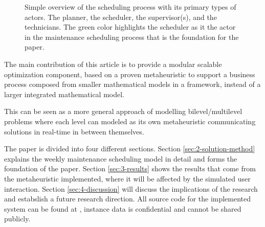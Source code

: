 \begin{figure}
	
	\caption{Simple overview of the scheduling process with its primary types of
		actors. The planner, the scheduler, the supervisor(s), and the technicians. 		
		The green color highlights the scheduler as it the actor in the maintenance
		scheduling process that is the foundation for the paper.}
	\label{fig:integrated:maintenance-process}
\end{figure}

The main contribution of this article is to provide a
modular scalable optimization component,  based on a proven
metaheuristic to support a business process composed from
smaller mathematical models in a framework, instead of a
larger integrated mathematical model.

This can be seen as a more general approach of modelling bilevel/multilevel
problems \citep{camacho-vallejo_metaheuristics_2024}  where each level can
modeled as its own metaheuristic communicating solutions in real-time in between
themselves.

The paper is divided into four different sections. Section \ref{sec:2-solution-method} explains
the weekly maintenance scheduling model in detail and forms the foundation of the paper. 
Section \ref{sec:3-results} shows the results that come from the metaheuristic implemented,
where it will be affected by the simulated user interaction. Section \ref{sec:4-discussion} 
will discuss the implications of the research and estabslish a future research direction.
All source code for the implemented system can be found at \citep{scipo-code-ordinator_api},
instance data is confidential and cannot be shared publicly.

